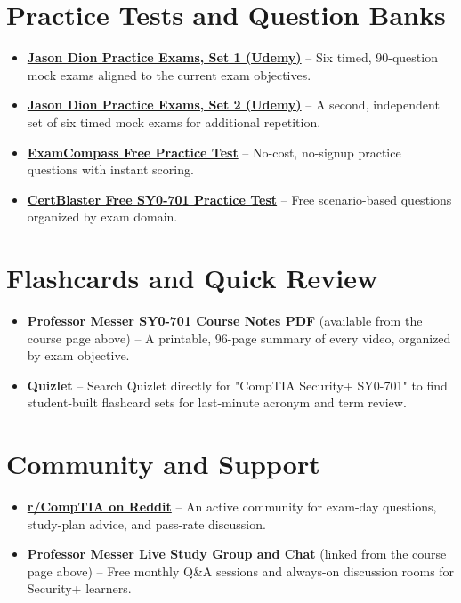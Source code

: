\documentclass[11pt,letterpaper]{article}
\begin{document}
\section{Practice Tests and Question Banks}
\begin{itemize}
\item \textbf{\href{https://www.udemy.com/course/comptia-security-sy0-701-practice-exams/}{Jason Dion Practice Exams, Set 1 (Udemy)}} -- Six timed, 90-question mock exams aligned to the current exam objectives.
\item \textbf{\href{https://www.udemy.com/course/comptia-security-sy0-701-practice-exams-2nd-edition/}{Jason Dion Practice Exams, Set 2 (Udemy)}} -- A second, independent set of six timed mock exams for additional repetition.
\item \textbf{\href{https://www.examcompass.com/comptia-security-plus-practice-test-1-exam-sy0-701}{ExamCompass Free Practice Test}} -- No-cost, no-signup practice questions with instant scoring.
\item \textbf{\href{https://certblaster.com/free-security-sy0-701-practice-test/}{CertBlaster Free SY0-701 Practice Test}} -- Free scenario-based questions organized by exam domain.
\end{itemize}

\section{Flashcards and Quick Review}
\begin{itemize}
\item \textbf{Professor Messer SY0-701 Course Notes PDF} (available from the course page above) -- A printable, 96-page summary of every video, organized by exam objective.
\item \textbf{Quizlet} -- Search Quizlet directly for "CompTIA Security+ SY0-701" to find student-built flashcard sets for last-minute acronym and term review.
\end{itemize}

\section{Community and Support}
\begin{itemize}
\item \textbf{\href{https://www.reddit.com/r/CompTIA/}{r/CompTIA on Reddit}} -- An active community for exam-day questions, study-plan advice, and pass-rate discussion.
\item \textbf{Professor Messer Live Study Group and Chat} (linked from the course page above) -- Free monthly Q\&A sessions and always-on discussion rooms for Security+ learners.
\end{itemize}
\end{document}
